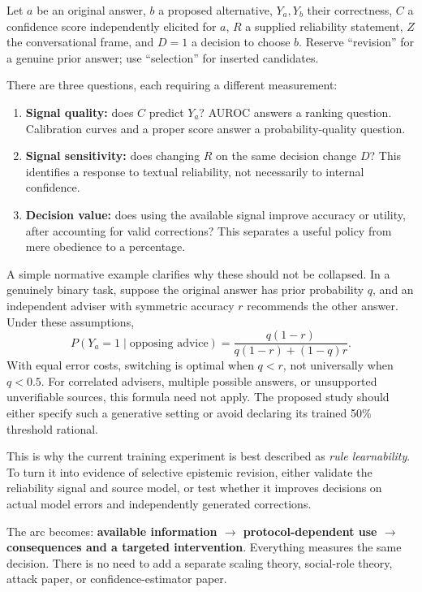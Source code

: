 \documentclass[11pt]{article}
\begin{document}
Let $a$ be an original answer, $b$ a proposed alternative, $Y_a,Y_b$ their correctness, $C$ a confidence score independently elicited for $a$, $R$ a supplied reliability statement, $Z$ the conversational frame, and $D=1$ a decision to choose $b$. Reserve ``revision'' for a genuine prior answer; use ``selection'' for inserted candidates.

There are three questions, each requiring a different measurement:
\begin{enumerate}
\item \textbf{Signal quality:} does $C$ predict $Y_a$? AUROC answers a ranking question. Calibration curves and a proper score answer a probability-quality question.
\item \textbf{Signal sensitivity:} does changing $R$ on the same decision change $D$? This identifies a response to textual reliability, not necessarily to internal confidence.
\item \textbf{Decision value:} does using the available signal improve accuracy or utility, after accounting for valid corrections? This separates a useful policy from mere obedience to a percentage.
\end{enumerate}

A simple normative example clarifies why these should not be collapsed. In a genuinely binary task, suppose the original answer has prior probability $q$, and an independent adviser with symmetric accuracy $r$ recommends the other answer. Under these assumptions,
\[
 P(Y_a=1\mid\text{opposing advice})=
 \frac{q(1-r)}{q(1-r)+(1-q)r}.
\]
With equal error costs, switching is optimal when $q<r$, not universally when $q<0.5$. For correlated advisers, multiple possible answers, or unsupported unverifiable sources, this formula need not apply. The proposed study should either specify such a generative setting or avoid declaring its trained 50\% threshold rational.

This is why the current training experiment is best described as \emph{rule learnability}. To turn it into evidence of selective epistemic revision, either validate the reliability signal and source model, or test whether it improves decisions on actual model errors and independently generated corrections.

\begin{takeaway}
The arc becomes: \textbf{available information $\rightarrow$ protocol-dependent use $\rightarrow$ consequences and a targeted intervention}. Everything measures the same decision. There is no need to add a separate scaling theory, social-role theory, attack paper, or confidence-estimator paper.
\end{takeaway}
\end{document}

